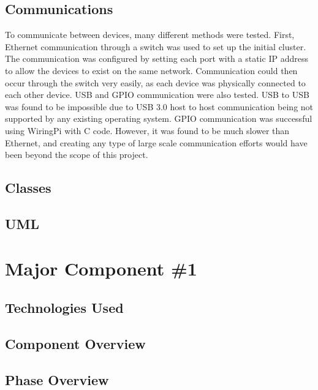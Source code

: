  \subsection{Communications}
	To communicate between devices, many different methods were tested. First, Ethernet communication through a switch was used to set up the initial cluster. The communication was configured by setting each port with a static IP address to allow the devices to exist on the same network. Communication could then occur through the switch very easily, as each device was physically connected to each other device. 
	USB and GPIO communication were also tested. USB to USB was found to be impossible due to USB 3.0 host to host communication being not supported by any existing operating system. GPIO communication was successful using WiringPi with C code. However, it was found to be much slower than Ethernet, and creating any type of large scale communication efforts would have been beyond the scope of this project.
 
 \subsection{Classes}
 
 \subsection{UML}

\section{Major Component \#1 }

\subsection{Technologies  Used}
	 

\subsection{Component  Overview}

\subsection{Phase Overview}

